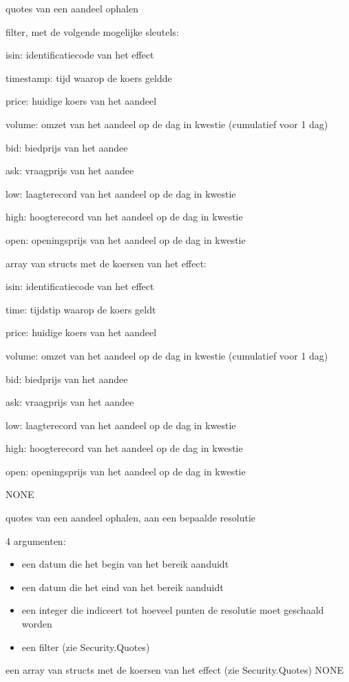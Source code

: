 	{ quotes van een aandeel ophalen }
	{ filter, met de volgende mogelijke sleutels:
		\begin{itemize_compact}
		\item{isin: identificatiecode van het effect}
		\item{timestamp: tijd waarop de koers geldde}
		\item{price: huidige koers van het aandeel}
		\item{volume: omzet van het aandeel op de dag in kwestie (cumulatief voor 1 dag)}
		\item{bid: biedprijs van het aandee}
		\item{ask: vraagprijs van het aandee}
		\item{low: laagterecord van het aandeel op de dag in kwestie}
		\item{high: hoogterecord van het aandeel op de dag in kwestie}
		\item{open: openingsprijs van het aandeel op de dag in kwestie}
		\end{itemize_compact} }
	{ array van structs met de koersen van het effect:
		\begin{itemize_compact}
		\item{isin: identificatiecode van het effect}
		\item{time: tijdstip waarop de koers geldt}
		\item{price: huidige koers van het aandeel}
		\item{volume: omzet van het aandeel op de dag in kwestie (cumulatief voor 1 dag)}
		\item{bid: biedprijs van het aandee}
		\item{ask: vraagprijs van het aandee}
		\item{low: laagterecord van het aandeel op de dag in kwestie}
		\item{high: hoogterecord van het aandeel op de dag in kwestie}
		\item{open: openingsprijs van het aandeel op de dag in kwestie}
		\end{itemize_compact} }
	{ NONE }

	{ quotes van een aandeel ophalen, aan een bepaalde resolutie }
	{ 4 argumenten:
		\begin{itemize}
		\item{een datum die het begin van het bereik aanduidt}
		\item{een datum die het eind van het bereik aanduidt}
		\item{een integer die indiceert tot hoeveel punten de resolutie moet geschaald worden}
		\item{een filter (zie Security.Quotes)}
		\end{itemize} }
	{ een array van structs met de koersen van het effect (zie Security.Quotes) }
	{ NONE }

